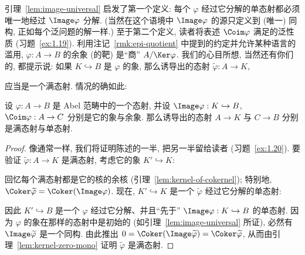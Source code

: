 \indent 引理~\ref{lem:image-universal} 启发了第一个定义: 每个 $\varphi$ 经过它分解的单态射都必须唯一地经过 $\Image\varphi$ 分解. (当然在这个语境中 $\Image\varphi$ 的源只定义到 (唯一) 同构, 正如每个泛问题的解一样.) 至于第二个定义, 读者将表述 $\Coim\varphi$ 满足的泛性质 (习题~\ref{ex:1.19}). 利用注记~\ref{rmk:epi-quotient} 中提到的约定并允许某种语言的滥用, $\varphi:A\to B$ 的余象 (的靶) 是``商'' $A/\Ker\varphi$.
我们的心目所想, 当然还有你们的, 都提示说: 如果 $K\hookrightarrow B$ 是 $\varphi$ 的象, 那么诱导出的态射 $\widetilde{\varphi}:A\to K$,
\begin{center}
\end{center}
应当是一个满态射. 情况的确如此:

\begin{lemma}\label{lem:coimage-image-epi-mono}
设 $\varphi:A\to B$ 是 Abel 范畴中的一个态射, 并设 $\Image\varphi:K\hookrightarrow B$, $\Coim\varphi:A\to C$ 分别是它的象与余象. 那么诱导出的态射 $A\to K$ 与 $C\to B$ 分别是满态射与单态射.
\end{lemma}

\begin{proof}
像通常一样, 我们将证明陈述的一半, 把另一半留给读者 (习题~\ref{ex:1.20}).
要验证 $\widetilde{\varphi}:A\to K$ 是满态射, 考虑它的象 $K'\hookrightarrow K$:
\begin{center}
\end{center}
回忆每个满态射都是它的核的余核 (引理~\ref{lem:kernel-of-cokernel}); 特别地, $\Coker\widetilde{\varphi}=\Coker(\Image\varphi)$. 现在, $K'\hookrightarrow K$ 是一个 $\widetilde{\varphi}$ 经过它分解的单态射:
\begin{center}
\end{center}
因此 $K'\hookrightarrow B$ 是一个 $\varphi$ 经过它分解、并且``先于'' $\Image\varphi:K\hookrightarrow B$ 的单态射. 因为 $\varphi$ 的象在那样的态射中是初始的 (如引理~\ref{lem:image-universal} 所证), 必然有 $\Image\widetilde{\varphi}$ 是一个同构. 由此推出 $0=\Coker(\Image\widetilde{\varphi})=\Coker\widetilde\varphi$, 从而由引理~\ref{lem:kernel-zero-mono} 证明 $\widetilde{\varphi}$ 是满态射.
\end{proof}

